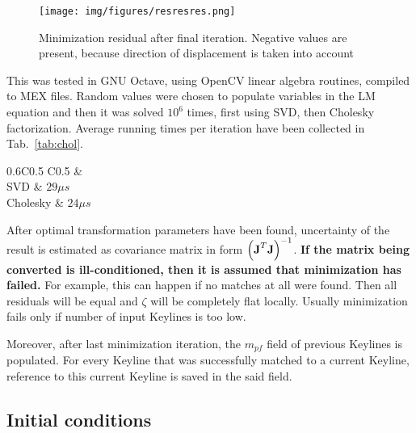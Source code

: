 \begin{figure}[ht]
	\centering\texttt{[image: img/figures/resresres.png]}
	\caption{ Minimization residual after final iteration. Negative values are present, because direction of displacement is taken into account }
	\label{fig:minim_res}
\end{figure}

This was tested in GNU Octave, using OpenCV \cite{opencv} linear algebra routines, compiled to MEX files. Random values were chosen to populate variables in the LM equation and then it was solved $10^6$ times, first using SVD, then Cholesky factorization. Average running times per iteration have been collected in Tab.~\ref{tab:chol}.

\begin{table}[ht]
	\centering
	
	\begin{threeparttable}
		\caption{SVD and Cholesky running time comparison}
		\label{tab:chol}
		
		\begin{tabularx}{0.6\textwidth}{C{0.5} C{0.5}}
			\toprule
			 &  \\
			\midrule
			SVD & $29 \mu s$ \\
			Cholesky & $24 \mu s$ \\
			\bottomrule
		\end{tabularx}
		
	\end{threeparttable}
\end{table}


After optimal transformation parameters have been found, uncertainty of the result is estimated as covariance matrix in form $\left( \textbf{J}^T \textbf{J} \right) ^ {-1}$. \textbf{If the matrix being converted is ill-conditioned, then it is assumed that minimization has failed.} For example, this can happen if no matches at all were found. Then all residuals will be equal and $\zeta$ will be completely flat locally. Usually minimization fails only if number of input Keylines is too low.

Moreover, after last minimization iteration, the $m_{pf}$ field of previous Keylines is populated. For every Keyline that was successfully matched to a current Keyline, reference to this current Keyline is saved in the said field.

\subsection{Initial conditions}


